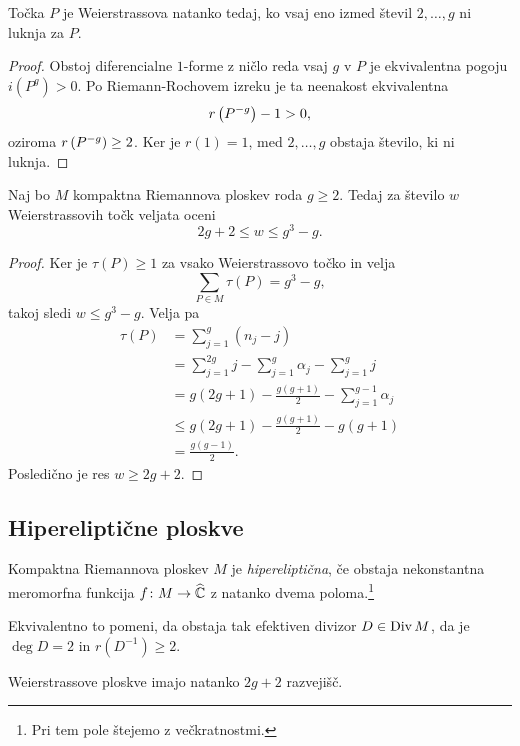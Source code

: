 \begin{trditev}
Točka $P$ je Weierstrassova natanko tedaj, ko vsaj eno izmed števil
$2, \dots, g$ ni luknja za $P$.
\end{trditev}

\begin{proof}
Obstoj diferencialne $1$-forme z ničlo reda vsaj $g$ v $P$ je
ekvivalentna pogoju $i(P^g) > 0$. Po Riemann-Rochovem izreku je ta
neenakost ekvivalentna
\[
r \left(P^{-g}\right) - 1 > 0,
\]
oziroma $r \left(P^{-g}\right) \geq 2$. Ker je $r(1) = 1$, med
$2, \dots, g$ obstaja število, ki ni luknja.
\end{proof}

\begin{trditev}
Naj bo $M$ kompaktna Riemannova ploskev roda $g \geq 2$. Tedaj za
število $w$ Weierstrassovih točk veljata oceni
\[
2g + 2 \leq w \leq g^3 - g.
\]
\end{trditev}

\begin{proof}
Ker je $\tau(P) \geq 1$ za vsako Weierstrassovo točko in velja
\[
\sum_{P \in M} \tau(P) = g^3 - g,
\]
takoj sledi $w \leq g^3 - g$. Velja pa
\begin{align*}
\tau(P) &= \sum_{j=1}^g (n_j - j)
\\
&=
\sum_{j=1}^{2g} j - \sum_{j=1}^g \alpha_j - \sum_{j=1}^g j
\\
&=
g(2g+1) - \frac{g(g+1)}{2} - \sum_{j=1}^{g-1} \alpha_j
\\
&\leq
g(2g+1) - \frac{g(g+1)}{2} - g(g+1)
\\
&=
\frac{g(g-1)}{2}.
\end{align*}
Posledično je res $w \geq 2g + 2$.
\end{proof}

\subsection{Hipereliptične ploskve}

\begin{definicija}
Kompaktna Riemannova ploskev $M$ je \emph{hipereliptična}, če
obstaja nekonstantna meromorfna funkcija $f \colon M \to \widehat{\mathbb{C}}$ z
natanko dvema poloma.\footnote{Pri tem pole štejemo z
večkratnostmi.}
\end{definicija}

Ekvivalentno to pomeni, da obstaja tak efektiven divizor
$D \in \operatorname{Div} M$, da je $\deg D = 2$ in $r(D^{-1}) \geq 2$.

\begin{trditev}
Weierstrassove ploskve imajo natanko $2g+2$ razvejišč.
\end{trditev}


